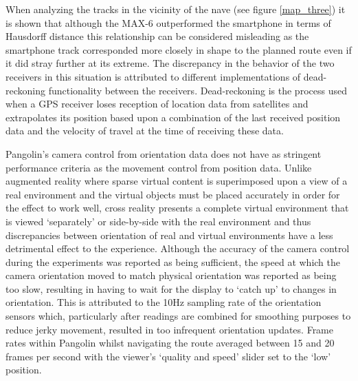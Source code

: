 When analyzing the tracks in the vicinity of the nave (see figure \ref{map_three}) it is shown that although the MAX-6 outperformed the smartphone in terms of Hausdorff distance this relationship can be considered misleading as the smartphone track corresponded more closely in shape to the planned route even if it did stray further at its extreme. The discrepancy in the behavior of the two receivers in this situation is attributed to different implementations of dead-reckoning functionality between the receivers. Dead-reckoning is the process used when a GPS receiver loses reception of location data from satellites and extrapolates its position based upon a combination of the last received position data and the velocity of travel at the time of receiving these data.
 

Pangolin's camera control from orientation data does not have as stringent performance criteria as the movement control from position data. Unlike augmented reality where sparse virtual content is superimposed upon a view of a real environment and the virtual objects must be placed accurately in order for the effect to work well, cross reality presents a complete virtual environment that is viewed `separately' or side-by-side with the real environment and thus discrepancies between orientation of real and virtual environments have a less detrimental effect to the experience. Although the accuracy of the camera control during the experiments was reported as being sufficient, the speed at which the camera orientation moved to match physical orientation was reported as being too slow, resulting in having to wait for the display to `catch up' to changes in orientation. This is attributed to the 10Hz sampling rate of the orientation sensors which, particularly after readings are combined for smoothing purposes to reduce jerky movement, resulted in too infrequent orientation updates. Frame rates within Pangolin whilst navigating the route averaged between 15 and 20 frames per second with the viewer's `quality and speed' slider set to the `low' position.

